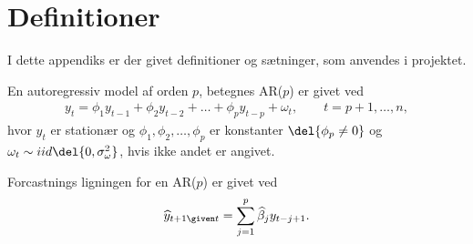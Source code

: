 \chapter{Definitioner} \label{app:def}
I dette appendiks er der givet definitioner og sætninger, som anvendes i projektet.

\begin{defn} \label{def:ar}
En autoregressiv model af orden $p$, betegnes AR($p$) er givet ved
\begin{align*}
y_t = \phi_1 y_{t-1} + \phi_2 y_{t-2} + \dots + \phi_p y_{t-p} + \omega_t, \qquad t = p+1, \dots, n,  
\end{align*}
hvor $y_t$ er stationær og $\phi_1 , \phi_2, \dots, \phi_p $ er konstanter  $\del{ \phi_p \neq 0}$ og $\omega_t \sim iid\del{0, \sigma_\omega^2}$, hvis ikke andet er angivet.  
\end{defn}
Forcastnings ligningen for en AR($p$) er givet ved 
\begin{equation}
\widehat{y}_{t+1 \given t} = \sum_{j = 1}^p \widehat{\beta}_j y_{t-j+1}.
\end{equation}

